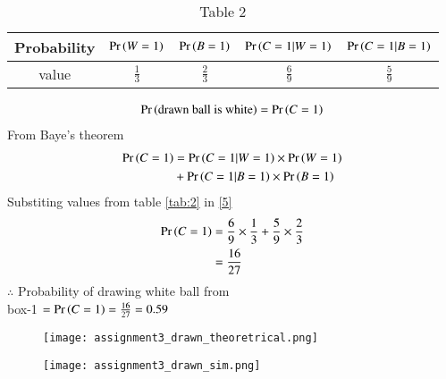 \documentclass[journal,12pt,twocolumn]{IEEEtran}
\begin{document}
\begin{table}[h!]
\resizebox{9.9cm}{!}
{ 
\begin{tabular}{|c|c|c|c|c|}
\hline
Probability & $\Pr\left(W=1\right)$ & $\Pr\left(B=1\right)$ & $\Pr\left(C=1|W=1\right)$ & $\Pr\left(C=1|B=1\right)$ \\
\hline
value & $\frac{1}{3}$ &  $\frac{2}{3}$ &  $\frac{6}{9}$ &  $\frac{5}{9}$ \\
\hline
\end{tabular}
}
\caption{Table 2} 
\label{tab:2}
\end{table}

\begin{align}
\Pr\left(\text{drawn ball is white}\right)&= \Pr\left(C=1\right)\\
\end{align}
 From Baye's theorem
\begin{align}
\Pr\left(C=1\right)&=\Pr\left(C=1|W=1\right) \times \Pr\left(W=1\right) \notag \\
 & +\Pr\left(C=1|B=1\right) \times \Pr\left(B=1\right)  \label{5}
\end{align}
Substiting values from table \eqref{tab:2} in \eqref{5}
\begin{align}
\Pr\left(C=1\right) &= \frac{6}{9} \times \frac{1}{3}  + \frac{5}{9} \times \frac{2}{3} \\
&=\frac{16}{27} \label{6}
\end{align}
$\therefore$ Probability of drawing white ball from\\
 box-1 $=\Pr\left(C=1\right)=\frac{16}{27}=0.59$
\begin{figure}[htb!]
\begin{center}
\texttt{[image: assignment3\_drawn\_theoretrical.png]}
\end{center}
\end{figure}

\begin{figure}[htb!]
\begin{center}
\texttt{[image: assignment3\_drawn\_sim.png]}
\end{center}
\end{figure}
\end{document}

